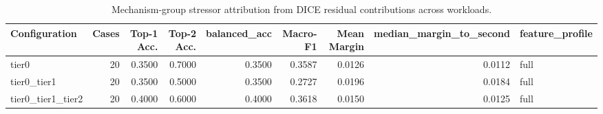 \begin{table}[t]
\centering
\caption{Mechanism-group stressor attribution from DICE residual contributions across workloads.}
\label{tab:dice_stressor_diagnosis}
\footnotesize
\begin{tabular}{lrrrrrrrl}
\toprule
Configuration & Cases & Top-1 Acc. & Top-2 Acc. & balanced_acc & Macro-F1 & Mean Margin & median_margin_to_second & feature_profile \\
\midrule
tier0 & 20 & 0.3500 & 0.7000 & 0.3500 & 0.3587 & 0.0126 & 0.0112 & full \\
tier0_tier1 & 20 & 0.3500 & 0.5000 & 0.3500 & 0.2727 & 0.0196 & 0.0184 & full \\
tier0_tier1_tier2 & 20 & 0.4000 & 0.6000 & 0.4000 & 0.3618 & 0.0150 & 0.0125 & full \\
\bottomrule
\end{tabular}

\end{table}
